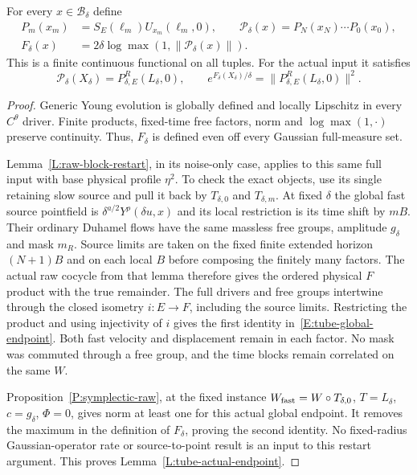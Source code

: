 \begin{lemma}\label{L:tube-actual-endpoint}
  For every $x\in\mathscr B_\delta$ define
  \[
    \begin{aligned}
      P_m(x_m)&=S_E(\ell_m)U_{x_m}(\ell_m,0),\qquad
      \mathcal P_\delta(x)=P_N(x_N)\cdots P_0(x_0),\\
      F_\delta(x)&=2\delta\log\max(1,\|\mathcal P_\delta(x)\|).
    \end{aligned}
  \]
  This is a finite continuous functional on all tuples.
  For the actual input it satisfies
  \begin{equation}\label{E:tube-global-endpoint}
    \mathcal P_\delta(X_\delta)
    =P_{\delta,E}^R(L_\delta,0),\qquad
    e^{F_\delta(X_\delta)/\delta}
    =\|P_{\delta,E}^R(L_\delta,0)\|^2 .
  \end{equation}
\end{lemma}

\begin{proof}
  Generic Young evolution is globally defined and locally Lipschitz
  in every $C^\theta$ driver. Finite products, fixed-time free
  factors, norm and $\log\max(1,\cdot)$ preserve continuity.
  Thus, $F_\delta$ is defined even off every Gaussian full-measure set.

  Lemma~\ref{L:raw-block-restart}, in its noise-only case, applies
  to this same full input with base physical profile $\eta^2$.
  To check the exact objects, use its single retaining slow source
  and pull it back by $T_{\delta,0}$ and $T_{\delta,m}$.
  At fixed $\delta$ the global fast source pointfield is
  $\delta^{a/2}Y^\rho(\delta u,x)$ and its local restriction is
  its time shift by $mB$.
  Their ordinary Duhamel flows have the same massless free groups,
  amplitude $g_\delta$ and mask $m_R$.
  Source limits are taken on the fixed finite extended horizon
  $(N+1)B$ and on each local $B$ before composing the finitely
  many factors. The actual raw cocycle from that lemma therefore
  gives the ordered physical $F$ product with the true remainder.
  The full drivers and free groups intertwine through the closed
  isometry $i:E\to F$, including the source limits.
  Restricting the product and using injectivity of $i$ gives
  the first identity in~\eqref{E:tube-global-endpoint}.
  Both fast velocity and displacement remain in each factor.
  No mask was commuted through a free group, and the time blocks
  remain correlated on the same $W$.

  Proposition~\ref{P:symplectic-raw}, at the fixed instance
  $W_{\rm fast}=W\circ T_{\delta,0}$, $T=L_\delta$,
  $c=g_\delta$, $\Phi=0$, gives norm at least one for this
  actual global endpoint. It removes the maximum in the
  definition of $F_\delta$, proving the second identity.
  No fixed-radius Gaussian-operator rate or source-to-point result
  is an input to this restart argument.
  This proves Lemma~\ref{L:tube-actual-endpoint}.
\end{proof}


